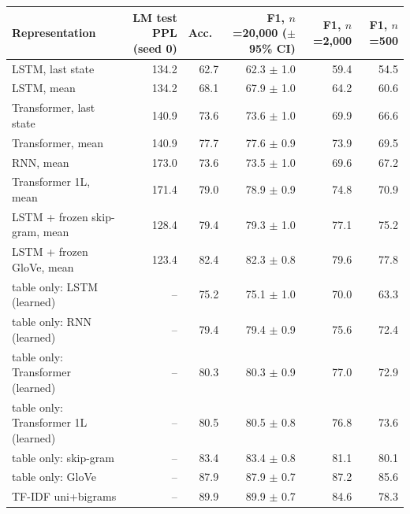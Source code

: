\begin{tabular}{@{}lrrrrr@{}}
\toprule
Representation & LM test PPL (seed 0) & Acc.\ & F1, $n$=20,000 ($\pm$95\% CI) & F1, $n$=2,000 & F1, $n$=500 \\
\midrule
LSTM, last state & 134.2 & 62.7 & 62.3 $\pm$ 1.0 & 59.4 & 54.5 \\
LSTM, mean & 134.2 & 68.1 & 67.9 $\pm$ 1.0 & 64.2 & 60.6 \\
Transformer, last state & 140.9 & 73.6 & 73.6 $\pm$ 1.0 & 69.9 & 66.6 \\
Transformer, mean & 140.9 & 77.7 & 77.6 $\pm$ 0.9 & 73.9 & 69.5 \\
RNN, mean & 173.0 & 73.6 & 73.5 $\pm$ 1.0 & 69.6 & 67.2 \\
Transformer 1L, mean & 171.4 & 79.0 & 78.9 $\pm$ 0.9 & 74.8 & 70.9 \\
LSTM + frozen skip-gram, mean & 128.4 & 79.4 & 79.3 $\pm$ 1.0 & 77.1 & 75.2 \\
LSTM + frozen GloVe, mean & 123.4 & 82.4 & 82.3 $\pm$ 0.8 & 79.6 & 77.8 \\
table only: LSTM (learned) & -- & 75.2 & 75.1 $\pm$ 1.0 & 70.0 & 63.3 \\
table only: RNN (learned) & -- & 79.4 & 79.4 $\pm$ 0.9 & 75.6 & 72.4 \\
table only: Transformer (learned) & -- & 80.3 & 80.3 $\pm$ 0.9 & 77.0 & 72.9 \\
table only: Transformer 1L (learned) & -- & 80.5 & 80.5 $\pm$ 0.8 & 76.8 & 73.6 \\
table only: skip-gram & -- & 83.4 & 83.4 $\pm$ 0.8 & 81.1 & 80.1 \\
table only: GloVe & -- & 87.9 & 87.9 $\pm$ 0.7 & 87.2 & 85.6 \\
TF-IDF uni+bigrams & -- & 89.9 & 89.9 $\pm$ 0.7 & 84.6 & 78.3 \\
\bottomrule
\end{tabular}